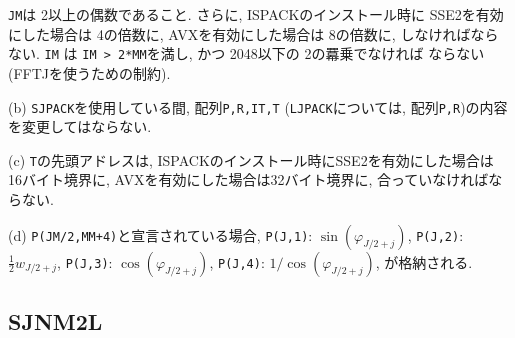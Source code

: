 \documentclass[a4j]{jarticle}
\begin{document}
\begin{enumerate}
{\tt JM}は 2以上の偶数であること. さらに, ISPACKのインストール時に
SSE2を有効にした場合は 4の倍数に,
AVXを有効にした場合は 8の倍数に, しなければならない.
{\tt IM} は {\tt IM > 2*MM}を満し, かつ 2048以下の 2の羃乗でなければ
ならない(FFTJを使うための制約).

(b) {\tt SJPACK}を使用している間, 配列{\tt P,R,IT,T}
({\tt LJPACK}については, 配列{\tt P,R})の内容を変更してはならない.

(c) {\tt T}の先頭アドレスは, ISPACKのインストール時にSSE2を有効にした場合は
16バイト境界に, AVXを有効にした場合は32バイト境界に, 合っていなければならない.

(d) {\tt P(JM/2,MM+4)}と宣言されている場合, 
   {\tt P(J,1)}:  $\sin(\varphi_{J/2+j})$,
   {\tt P(J,2)}:  $\frac12 w_{J/2+j}$, 
   {\tt P(J,3)}:  $\cos(\varphi_{J/2+j})$,
   {\tt P(J,4)}:  $1/\cos(\varphi_{J/2+j})$,
が格納される.

\end{enumerate}


\subsection{SJNM2L}
\end{document}
